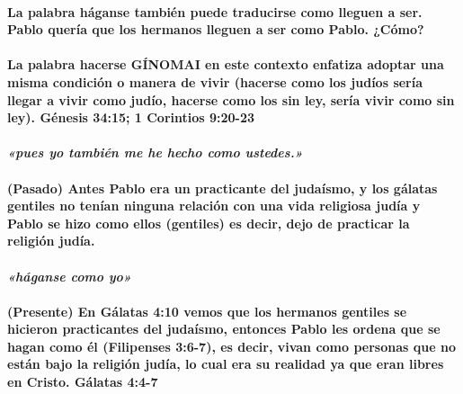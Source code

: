 \documentclass[11a pt,twoside]{article}
\newcommand{\scripture}[1]{%
  {\fontsize{12pt}{16pt}\selectfont\ScriptureFont\itshape #1}%
}
\let\oldparagraph\paragraph
\renewcommand{\paragraph}{\needspace{3\baselineskip}\oldparagraph}
\begin{document}
\paragraph{La palabra háganse también puede traducirse como lleguen a
ser. Pablo quería que los hermanos lleguen a ser como Pablo.
¿Cómo?}\label{la-palabra-huxe1ganse-tambiuxe9n-puede-traducirse-como-lleguen-a-ser.-pablo-queruxeda-que-los-hermanos-lleguen-a-ser-como-pablo.-cuxf3mo}

\paragraph{La palabra hacerse GÍNOMAI en este contexto enfatiza adoptar
una misma condición o manera de vivir (hacerse como los judíos sería
llegar a vivir como judío, hacerse como los sin ley, sería vivir como
sin ley). Génesis 34:15; 1 Corintios
9:20-23}\label{la-palabra-hacerse-guxednomai-en-este-contexto-enfatiza-adoptar-una-misma-condiciuxf3n-o-manera-de-vivir-hacerse-como-los-juduxedos-seruxeda-llegar-a-vivir-como-juduxedo-hacerse-como-los-sin-ley-seruxeda-vivir-como-sin-ley.-guxe9nesis-3415-1-corintios-920-23}

\paragraph{\texorpdfstring{\scripture{«pues yo también me he hecho como ustedes.»}}{}}\label{pues-yo-tambiuxe9n-me-he-hecho-como-ustedes.}

\paragraph{(Pasado) Antes Pablo era un practicante del judaísmo, y los
gálatas gentiles no tenían ninguna relación con una vida religiosa judía
y Pablo se hizo como ellos (gentiles) es decir, dejo de practicar la
religión
judía.}\label{pasado-antes-pablo-era-un-practicante-del-judauxedsmo-y-los-guxe1latas-gentiles-no-tenuxedan-ninguna-relaciuxf3n-con-una-vida-religiosa-juduxeda-y-pablo-se-hizo-como-ellos-gentiles-es-decir-dejo-de-practicar-la-religiuxf3n-juduxeda.}

\paragraph{\texorpdfstring{\scripture{«háganse como yo»}}{}}\label{huxe1ganse-como-yo}

\paragraph{(Presente) En Gálatas 4:10 vemos que los hermanos gentiles se
hicieron practicantes del judaísmo, entonces Pablo les ordena que se
hagan como él (Filipenses 3:6-7), es decir, vivan como personas que no
están bajo la religión judía, lo cual era su realidad ya que eran libres
en Cristo. Gálatas
4:4-7}\label{presente-en-guxe1latas-410-vemos-que-los-hermanos-gentiles-se-hicieron-practicantes-del-judauxedsmo-entonces-pablo-les-ordena-que-se-hagan-como-uxe9l-filipenses-36-7-es-decir-vivan-como-personas-que-no-estuxe1n-bajo-la-religiuxf3n-juduxeda-lo-cual-era-su-realidad-ya-que-eran-libres-en-cristo.-guxe1latas-44-7}
\end{document}
